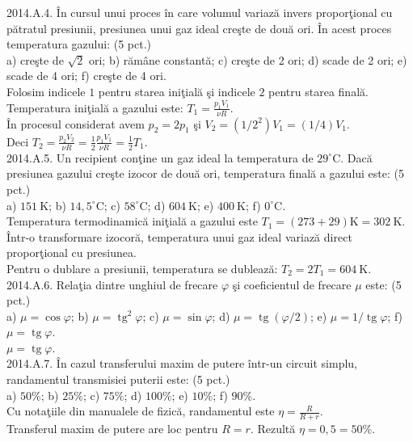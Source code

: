 2014.A.4. În cursul unui proces în care volumul variază invers proporţional cu pătratul presiunii, presiunea unui gaz ideal creşte de două ori. În acest proces temperatura gazului: (5 pct.)\\ a) creşte de $\sqrt{2}$ ori; b) rămâne constantă; c) creşte de 2 ori; d) scade de 2 ori; e) scade de 4 ori; f) creşte de 4 ori.\\ Folosim indicele $1$ pentru starea iniţială şi indicele $2$ pentru starea finală. Temperatura iniţială a gazului este: $T_{1}=\frac{p_{1} V_{1}}{\nu R}$.\\ În procesul considerat avem $p_{2}=2 p_{1}$ şi $V_{2}=\left(1 / 2^{2}\right) V_{1}=(1 / 4) V_{1}$.\\ Deci $T_{2}=\frac{p_{2} V_{2}}{\nu R}=\frac{1}{2} \frac{p_{1} V_{1}}{\nu R}=\frac{1}{2} T_{1}$.\\

2014.A.5. Un recipient conţine un gaz ideal la temperatura de $29^{\circ} \mathrm{C}$. Dacă presiunea gazului creşte izocor de două ori, temperatura finală a gazului este: (5 pct.)\\ a) $151 \mathrm{~K}$; b) $14,5^{\circ} \mathrm{C}$; c) $58^{\circ} \mathrm{C}$; d) $604 \mathrm{~K}$; e) $400 \mathrm{~K}$; f) $0^{\circ} \mathrm{C}$.\\ Temperatura termodinamică iniţială a gazului este $T_{1}=(273+29) \mathrm{K}=302 \mathrm{~K}$. Într-o transformare izocoră, temperatura unui gaz ideal variază direct proporţional cu presiunea.\\ Pentru o dublare a presiunii, temperatura se dublează: $T_{2}=2 T_{1}=604 \mathrm{~K}$.\\

2014.A.6. Relaţia dintre unghiul de frecare $\varphi$ şi coeficientul de frecare $\mu$ este: (5 pct.)\\ a) $\mu=\cos \varphi$; b) $\mu=\operatorname{tg}^{2} \varphi$; c) $\mu=\sin \varphi$; d) $\mu=\operatorname{tg}(\varphi / 2)$; e) $\mu=1 / \operatorname{tg} \varphi$; f) $\mu=\operatorname{tg} \varphi$.\\ $\mu=\operatorname{tg} \varphi$.\\

2014.A.7. În cazul transferului maxim de putere într-un circuit simplu, randamentul transmisiei puterii este: (5 pct.)\\ a) $50 \%$; b) $25 \%$; c) $75 \%$; d) $100 \%$; e) $10 \%$; f) $90 \%$.\\ Cu notaţiile din manualele de fizică, randamentul este $\eta=\frac{R}{R+r}$.\\ Transferul maxim de putere are loc pentru $R=r$. Rezultă $\eta=0,5=50 \%$.\\

